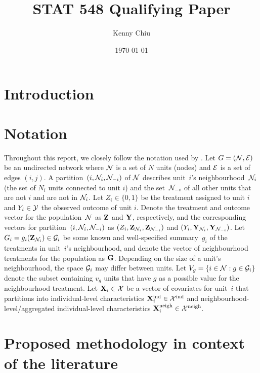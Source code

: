 \documentclass[10pt]{article}
\title{\todo\\\vspace{0.5em}\large{STAT 548 Qualifying Paper}}
\author{Kenny Chiu}
\date{\today}
\begin{document}
\maketitle

\vspace{2em}

\begin{abstract}
\todo
\end{abstract}

\vspace{2em}


\section{Introduction}


\section{Notation}

Throughout this report, we closely follow the notation used by \textcite{Forastiere:2021}. Let $G=(\mathcal{N},\mathcal{E})$ be an undirected network where $\mathcal{N}$ is a set of $N$ units (nodes) and $\mathcal{E}$ is a set of edges $(i,j)$. A partition~$(i,\mathcal{N}_i,\mathcal{N}_{-i})$ of $\mathcal{N}$ describes unit~$i$'s neighbourhood~$\mathcal{N}_i$ (the set of $N_i$ units connected to unit $i$) and the set~$\mathcal{N}_{-i}$ of all other units that are not $i$ and are not in $\mathcal{N}_i$. Let $Z_i\in\{0,1\}$ be the treatment assigned to unit $i$ and $Y_i\in\mathcal{Y}$ the observed outcome of unit $i$. Denote the treatment and outcome vector for the population~$\mathcal{N}$ as $\mathbf{Z}$ and $\mathbf{Y}$, respectively, and the corresponding vectors for partition~$(i,\mathcal{N}_i,\mathcal{N}_{-i})$ as $(Z_i,\mathbf{Z}_{\mathcal{N}_i},\mathbf{Z}_{\mathcal{N}_{-i}})$ and $(Y_i,\mathbf{Y}_{\mathcal{N}_i},\mathbf{Y}_{\mathcal{N}_{-i}})$. Let $G_i=g_i(\mathbf{Z}_{\mathcal{N}_i})\in\mathcal{G}_i$ be some known and well-specified summary~$g_i$ of the treatments in unit~$i$'s neighbourhood, and denote the vector of neighbourhood treatments for the population as $\mathbf{G}$. Depending on the size of a unit's neighbourhood, the space $\mathcal{G}_i$ may differ between units. Let $V_g=\{i\in\mathcal{N}:g\in\mathcal{G}_i\}$ denote the subset containing $v_g$ units that have $g$ as a possible value for the neighbourhood treatment. Let $\mathbf{X}_i\in\mathcal{X}$ be a vector of covariates for unit~$i$ that partitions into individual-level characteristics $\mathbf{X}^{\text{ind}}_i\in\mathcal{X}^\text{ind}$ and neighbourhood-level/aggregated individual-level characteristics $\mathbf{X}^{\text{neigh}}_i\in\mathcal{X}^\text{neigh}$.


\section{Proposed methodology in context of the literature}
\end{document}
